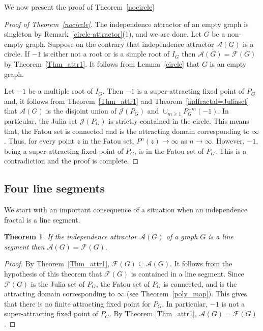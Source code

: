\documentclass[12pt,a4paper]{article}
\theoremstyle{plain}
\newtheorem{theorem}{Theorem}[section]
\numberwithin{equation}{section}
\begin{document}
We now present the proof of Theorem~\ref{nocircle}
\begin{proof}[Proof of Theorem~\ref{nocircle}]
	The independence attractor of an empty graph is singleton by Remark~\ref{circle-attractor}(1), and we are done. Let $G$ be a non-empty graph. 
	 Suppose on the contrary that independence attractor $\mathcal{A}(G)$ is a circle. If $-1$ is either not a root  or is a simple root of $I_G$ then $ \mathcal{A}(G)=\mathcal{F}(G)$ by Theorem~\ref{Thm_attr1}. It follows from Lemma~\ref{circle} that $G$ is an empty graph. 
	 \par 
	 Let $-1$ be a multiple root of $I_G$. Then $-1$ is a super-attracting fixed point of $P_G$ and, it follows from Theorem~\ref{Thm_attr1} and Theorem~\ref{indfractal=Juliaset} that $\mathcal{A}(G)$ is the disjoint union of $\mathcal{J}(P_G)$ and $\cup_{m \geq 1} P_G ^{-m}(-1)$. In particular, the Julia set  $\mathcal{J}(P_G)$ is strictly contained in the circle. This means that, the Fatou set is connected and is the attracting domain corresponding to $\infty$. Thus, for every point $z$ in the Fatou set, $P^n (z) \to \infty$ as $n \to \infty$. However, $-1$, being a super-attracting fixed point of $P_G$, is in the Fatou set of $P_G$.    This is a contradiction and the proof is complete.
\end{proof}
\subsection{Four line segments}
We start with an important consequence of a situation when an independence fractal is a line segment.
\begin{theorem}
	If the independence attractor $\mathcal{A}(G)$ of a graph $G$ is a line segment then  $\mathcal{A}(G)=\mathcal{F}(G)$.
	\label{attractor=fractal}
\end{theorem}

\begin{proof} By Theorem~\ref{Thm_attr1}, $\mathcal{F}(G) \subseteq \mathcal{A}(G)$. It follows from the hypothesis of this theorem that $\mathcal{F}(G)$
 is contained in a line segment. Since $\mathcal{F}(G)$ is  the Julia set of $P_G$,  the Fatou set of $P_G$ is connected, and is the attracting domain corresponding to $\infty$ (see Theorem~\ref{poly_map}). This gives that there is no finite attracting fixed point for $P_G$. In particular, $-1$ is not a super-attracting fixed point of $P_G$. By Theorem \ref{Thm_attr1}, $\mathcal{A}(G)=\mathcal{F}(G)$.
\end{proof}
\end{document}
